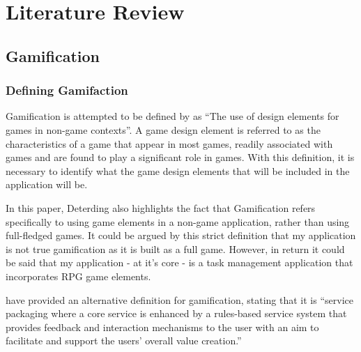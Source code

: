 

\chapter{Literature Review}
\label{chap:litReview}

\section{Gamification}
\subsection{Defining Gamifaction}
Gamification is attempted to be defined by \cite{Deterding:2011:GDE:2181037.2181040} as ``The use of design elements for games in non-game contexts''. 
A game design element is referred to as the characteristics of a game that appear in most games, readily associated with games and are found to play a significant role in games.
With this definition, it is necessary to identify what the game design elements that will be included in the application will be. 

In this paper, Deterding also highlights the fact that Gamification refers specifically to using game elements in a non-game application, rather than using full-fledged games.
It could be argued by this strict definition that my application is not true gamification as it is built as a full game.
However, in return it could be said that my application - at it's core - is a task management application that incorporates RPG game elements.

\cite{huotari2011gamification} have provided an alternative definition for gamification, stating that it is ``service packaging where a core service is enhanced by a rules-based service system that provides feedback and interaction mechanisms to the user with an aim to facilitate and support the users’ overall value creation.''


